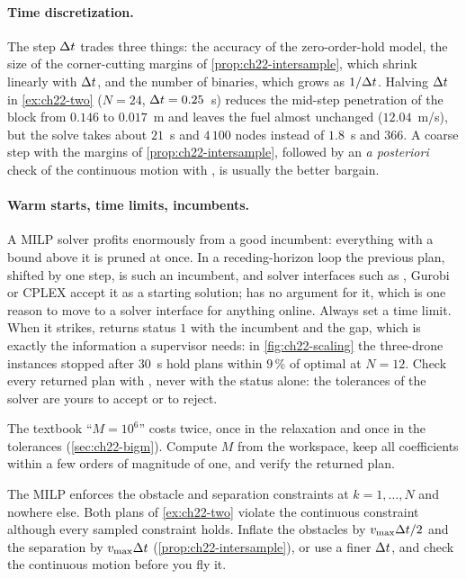 \paragraph{Time discretization.}
The step $\Delta t$ trades three things: the accuracy of the zero-order-hold
model, the size of the corner-cutting margins of
\cref{prop:ch22-intersample}, which shrink linearly with $\Delta t$, and the
number of binaries, which grows as $1/\Delta t$. Halving $\Delta t$ in
\cref{ex:ch22-two} ($N = 24$, $\Delta t = 0.25$~s) reduces the mid-step
penetration of the block from $0.146$ to $0.017$~m and leaves the fuel
almost unchanged ($12.04$~m/s), but the solve takes about $21$~s and
$4\,100$ nodes instead of $1.8$~s and $366$. A coarse step with the margins
of \cref{prop:ch22-intersample}, followed by an \emph{a posteriori} check
of the continuous motion with , is usually the
better bargain.

\paragraph{Warm starts, time limits, incumbents.}
A MILP solver profits enormously from a good incumbent: everything with a
bound above it is pruned at once. In a receding-horizon loop the previous
plan, shifted by one step, is such an incumbent, and solver interfaces such
as , Gurobi or CPLEX accept it as a starting solution;
 has no argument for it, which is one reason to
move to a solver interface for anything online. Always set a time limit.
When it strikes,  returns status $1$ with the incumbent and the
gap, which is exactly the information a supervisor needs: in
\cref{fig:ch22-scaling} the three-drone instances stopped after $30$~s
hold plans within $9$\,\% of optimal at $N = 12$. Check every returned
plan with , never with the status alone: the
tolerances of the solver are yours to accept or to reject.

\begin{pitfall}[A huge $M$]
The textbook ``$M = 10^6$'' costs twice, once in the relaxation and once
in the tolerances (\cref{sec:ch22-bigm}). Compute $M$ from the workspace,
keep all coefficients within a few orders of magnitude of one, and verify
the returned plan.
\end{pitfall}

\begin{pitfall}
The MILP enforces the obstacle and separation constraints at $k = 1,
\dots, N$ and nowhere else. Both plans of \cref{ex:ch22-two} violate the
continuous constraint although every sampled constraint holds. Inflate the
obstacles by $v_{\max}\Delta t/2$ and the separation by $v_{\max}\Delta t$
(\cref{prop:ch22-intersample}), or use a finer $\Delta t$, and check the
continuous motion before you fly it.
\end{pitfall}

